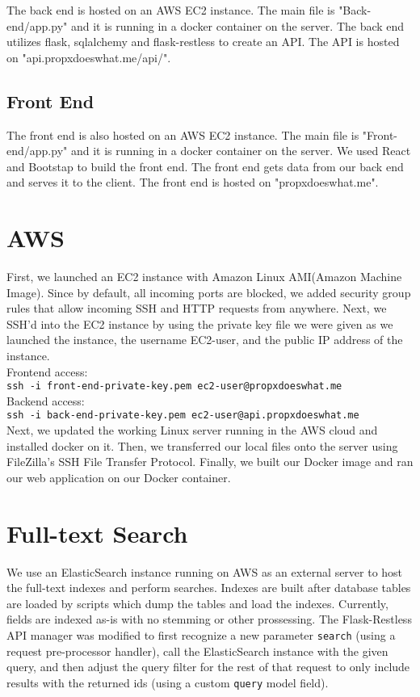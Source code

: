 \documentclass[12pt]{article}
\newcommand{\code}[1]{\texttt{#1}}
\begin{document}
The back end is hosted on an AWS EC2 instance. The main file is "Back-end/app.py" and it is running in a docker container on the server. The back end utilizes flask, sqlalchemy and flask-restless to create an API. The API is hosted on "api.propxdoeswhat.me/api/".

\subsection{Front End}

The front end is also hosted on an AWS EC2 instance. The main file is "Front-end/app.py" and it is running in a docker container on the server. We used React and Bootstap to build the front end. The front end gets data from our back end and serves it to the client. The front end is hosted on "propxdoeswhat.me".

\section{AWS}

First, we launched an EC2 instance with Amazon Linux AMI(Amazon Machine Image). Since by default, all incoming ports are blocked, we added security group rules that allow incoming SSH and HTTP requests from anywhere. Next, we SSH'd into the EC2 instance by using the private key file we were given as we launched the instance, the username EC2-user, and the public IP address of the instance. \\

Frontend access: \\
\code{ssh -i front-end-private-key.pem ec2-user@propxdoeswhat.me} \\
Backend access: \\
\code{ssh -i back-end-private-key.pem ec2-user@api.propxdoeswhat.me} \\

Next, we updated the working Linux server running in the AWS cloud and installed docker on it. Then, we transferred our local files onto the server using FileZilla's SSH File Transfer Protocol. Finally, we built our Docker image and ran our web application on our Docker container.

\section{Full-text Search}

We use an ElasticSearch instance running on AWS as an external server to host the full-text indexes and perform searches. Indexes are built after database tables are loaded by scripts which dump the tables and load the indexes. Currently, fields are indexed as-is with no stemming or other prossessing. The Flask-Restless API manager was modified to first recognize a new parameter \code{search} (using a request pre-processor handler), call the ElasticSearch instance with the given query, and then adjust the query filter for the rest of that request to only include results with the returned ids (using a custom \code{query} model field).
\end{document}

